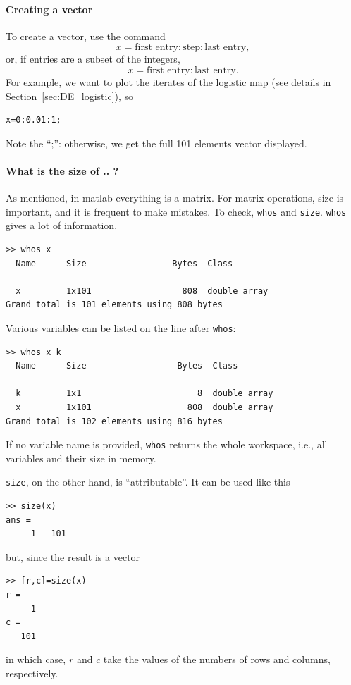 \paragraph{Creating a vector}
To create a vector, use the command
\[
x=\textrm{first entry}:\textrm{step}:\textrm{last entry},
\]
or, if entries are a subset of the integers,
\[
x=\textrm{first entry}:\textrm{last entry}.
\]
For example, we want to plot the iterates of the logistic map (see details in Section~\ref{sec:DE_logistic}), so
\begin{verbatim}
x=0:0.01:1;
\end{verbatim}
Note the ``;'': otherwise, we get the full 101 elements vector displayed.

\paragraph{What is the size of .. ?}
As mentioned, in matlab everything is a matrix. For matrix operations, size is important, and it is frequent to make mistakes. To check, {\tt whos} and {\tt size}. {\tt whos} gives a lot of information.
\begin{verbatim}
>> whos x
  Name      Size                 Bytes  Class
  
  x         1x101                  808  double array
Grand total is 101 elements using 808 bytes
\end{verbatim}
Various variables can be listed on the line after {\tt whos}:
\begin{verbatim}
>> whos x k
  Name      Size                  Bytes  Class
  
  k         1x1                       8  double array
  x         1x101                   808  double array
Grand total is 102 elements using 816 bytes
\end{verbatim}
If no variable name is provided, {\tt whos} returns the whole workspace, i.e., all variables and their size in memory.

{\tt size}, on the other hand, is ``attributable''. It can be used like this
\begin{verbatim}
>> size(x)
ans =
     1   101
\end{verbatim}
but, since the result is a vector
\begin{verbatim}
>> [r,c]=size(x)
r =
     1
c =
   101
\end{verbatim}
in which case, $r$ and $c$ take the values of the numbers of rows and columns, respectively.


